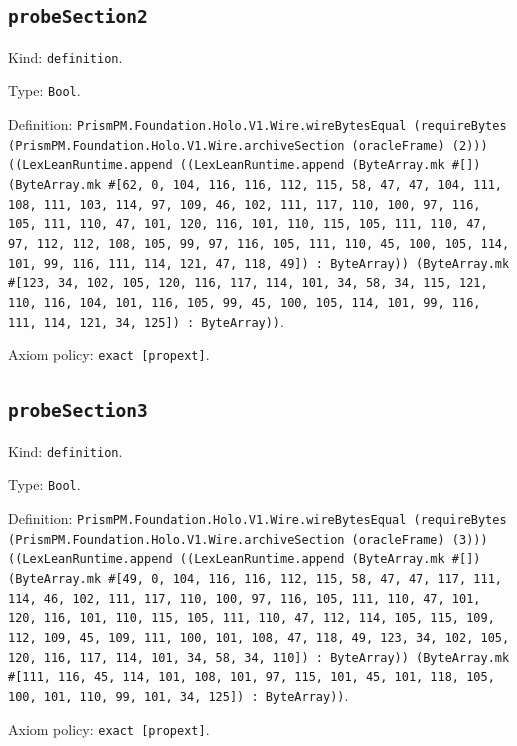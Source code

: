 \documentclass[11pt]{article}
\begin{document}
\subsection*{\texttt{probeSection2}}
\noindent Kind: \texttt{definition}.\par
\noindent Type: \texttt{Bool}.\par
\noindent Definition: \texttt{PrismPM.Foundation.Holo.V1.Wire.wireBytesEqual (requireBytes (PrismPM.Foundation.Holo.V1.Wire.archiveSection (oracleFrame) (2))) ((LexLeanRuntime.append ((LexLeanRuntime.append (ByteArray.mk \#[]) (ByteArray.mk \#[62, 0, 104, 116, 116, 112, 115, 58, 47, 47, 104, 111, 108, 111, 103, 114, 97, 109, 46, 102, 111, 117, 110, 100, 97, 116, 105, 111, 110, 47, 101, 120, 116, 101, 110, 115, 105, 111, 110, 47, 97, 112, 112, 108, 105, 99, 97, 116, 105, 111, 110, 45, 100, 105, 114, 101, 99, 116, 111, 114, 121, 47, 118, 49]) : ByteArray)) (ByteArray.mk \#[123, 34, 102, 105, 120, 116, 117, 114, 101, 34, 58, 34, 115, 121, 110, 116, 104, 101, 116, 105, 99, 45, 100, 105, 114, 101, 99, 116, 111, 114, 121, 34, 125]) : ByteArray))}.\par
\noindent Axiom policy: \texttt{exact [propext]}.\par
\subsection*{\texttt{probeSection3}}
\noindent Kind: \texttt{definition}.\par
\noindent Type: \texttt{Bool}.\par
\noindent Definition: \texttt{PrismPM.Foundation.Holo.V1.Wire.wireBytesEqual (requireBytes (PrismPM.Foundation.Holo.V1.Wire.archiveSection (oracleFrame) (3))) ((LexLeanRuntime.append ((LexLeanRuntime.append (ByteArray.mk \#[]) (ByteArray.mk \#[49, 0, 104, 116, 116, 112, 115, 58, 47, 47, 117, 111, 114, 46, 102, 111, 117, 110, 100, 97, 116, 105, 111, 110, 47, 101, 120, 116, 101, 110, 115, 105, 111, 110, 47, 112, 114, 105, 115, 109, 112, 109, 45, 109, 111, 100, 101, 108, 47, 118, 49, 123, 34, 102, 105, 120, 116, 117, 114, 101, 34, 58, 34, 110]) : ByteArray)) (ByteArray.mk \#[111, 116, 45, 114, 101, 108, 101, 97, 115, 101, 45, 101, 118, 105, 100, 101, 110, 99, 101, 34, 125]) : ByteArray))}.\par
\noindent Axiom policy: \texttt{exact [propext]}.\par
\end{document}
